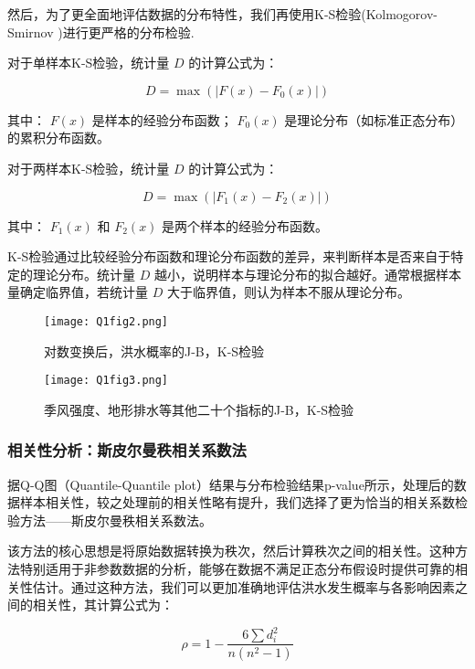 \documentclass[withoutpreface,bwprint]{cumcmthesis} %
\begin{document}
然后，为了更全面地评估数据的分布特性，我们再使用K-S检验(Kolmogorov-Smirnov )进行更严格的分布检验.

对于单样本K-S检验，统计量 \( D \) 的计算公式为：

\begin{equation}
D = \max(|F(x) - F_0(x)|)
\end{equation}

其中：
\( F(x) \) 是样本的经验分布函数；
\( F_0(x) \) 是理论分布（如标准正态分布）的累积分布函数。

对于两样本K-S检验，统计量 \( D \) 的计算公式为：

\begin{equation}
D = \max(|F_1(x) - F_2(x)|)
\end{equation}

其中：
\( F_1(x) \) 和 \( F_2(x) \) 是两个样本的经验分布函数。

K-S检验通过比较经验分布函数和理论分布函数的差异，来判断样本是否来自于特定的理论分布。统计量 \( D \) 越小，说明样本与理论分布的拟合越好。通常根据样本量确定临界值，若统计量 \( D \) 大于临界值，则认为样本不服从理论分布。


\begin{figure}[htbp]
	\centering
	\texttt{[image: Q1fig2.png]}
	\caption{对数变换后，洪水概率的J-B，K-S检验}\label{q1fig2}
\end{figure}
\begin{figure}[htbp]
	\centering
	\texttt{[image: Q1fig3.png]} 
	\caption{季风强度、地形排水等其他二十个指标的J-B，K-S检验}\label{q1fig3}
\end{figure}


\subsubsection{相关性分析：斯皮尔曼秩相关系数法}
据Q-Q图（Quantile-Quantile plot）结果与分布检验结果p-value所示，处理后的数据样本相关性，较之处理前的相关性略有提升，我们选择了更为恰当的相关系数检验方法——斯皮尔曼秩相关系数法。

该方法的核心思想是将原始数据转换为秩次，然后计算秩次之间的相关性。这种方法特别适用于非参数数据的分析，能够在数据不满足正态分布假设时提供可靠的相关性估计。通过这种方法，我们可以更加准确地评估洪水发生概率与各影响因素之间的相关性，其计算公式为：

\begin{equation}\label{eq5}
	\rho = 1 - \frac{6 \sum d_i^2}{n(n^2 - 1)}
\end{equation}
\end{document}
